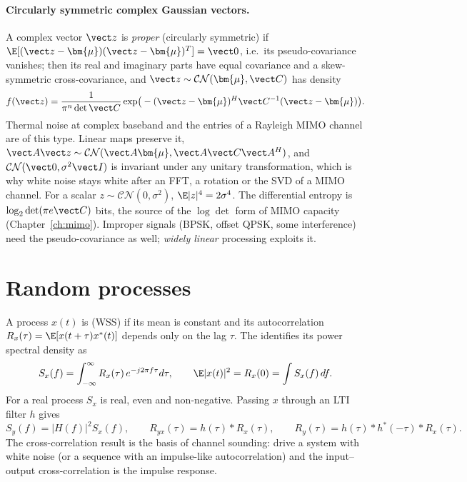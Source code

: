 \paragraph{Circularly symmetric complex Gaussian vectors.} A complex vector $\vect z$ is
\emph{proper} (circularly symmetric) if $\E[(\vect z-\bm{\mu})(\vect z-\bm{\mu})^T]=\vect 0$,
i.e.\ its pseudo-covariance vanishes; then its real and imaginary parts have equal covariance and
a skew-symmetric cross-covariance, and $\vect z\sim\mathcal{CN}(\bm{\mu},\vect C)$ has density
\begin{equation}
f(\vect z)=\frac{1}{\pi^n\det\vect C}\exp\!\big(-(\vect z-\bm{\mu})^H\vect C^{-1}(\vect z-\bm{\mu})\big).
\label{eq:appA:cn}
\end{equation}
Thermal noise at complex baseband and the entries of a Rayleigh MIMO channel are of this type.
Linear maps preserve it, $\vect A\vect z\sim\mathcal{CN}(\vect A\bm{\mu},\vect A\vect C\vect A^H)$, and
$\mathcal{CN}(\vect0,\sigma^2\vect I)$ is invariant under any unitary transformation, which is why
white noise stays white after an FFT, a rotation or the SVD of a MIMO channel. For a scalar
$z\sim\mathcal{CN}(0,\sigma^2)$, $\E|z|^4=2\sigma^4$. The differential entropy is
$\log_2\det(\pi e\vect C)$ bits, the source of the $\log\det$ form of MIMO capacity
(Chapter~\ref{ch:mimo}). Improper signals (BPSK, offset QPSK, some interference) need the
pseudo-covariance as well; \emph{widely linear} processing exploits it.

\section{Random processes}
\label{sec:appA:processes}

A process $x(t)$ is  (WSS) if its mean is constant and its
autocorrelation $R_x(\tau)=\E[x(t+\tau)x^*(t)]$ depends only on the lag $\tau$. The
 identifies its power spectral density as
\begin{equation}
S_x(f)=\int_{-\infty}^{\infty}R_x(\tau)\,e^{-j2\pi f\tau}d\tau,\qquad
\E|x(t)|^2=R_x(0)=\int S_x(f)\,df.
\label{eq:appA:wk}
\end{equation}
For a real process $S_x$ is real, even and non-negative. Passing $x$ through an LTI filter $h$ gives
\begin{equation}
S_y(f)=|H(f)|^2S_x(f),\qquad R_{yx}(\tau)=h(\tau)*R_x(\tau),\qquad R_y(\tau)=h(\tau)*h^*(-\tau)*R_x(\tau).
\label{eq:appA:lti}
\end{equation}
The cross-correlation result is the basis of channel sounding: drive a system with white noise
(or a sequence with an impulse-like autocorrelation) and the input--output cross-correlation is
the impulse response.

